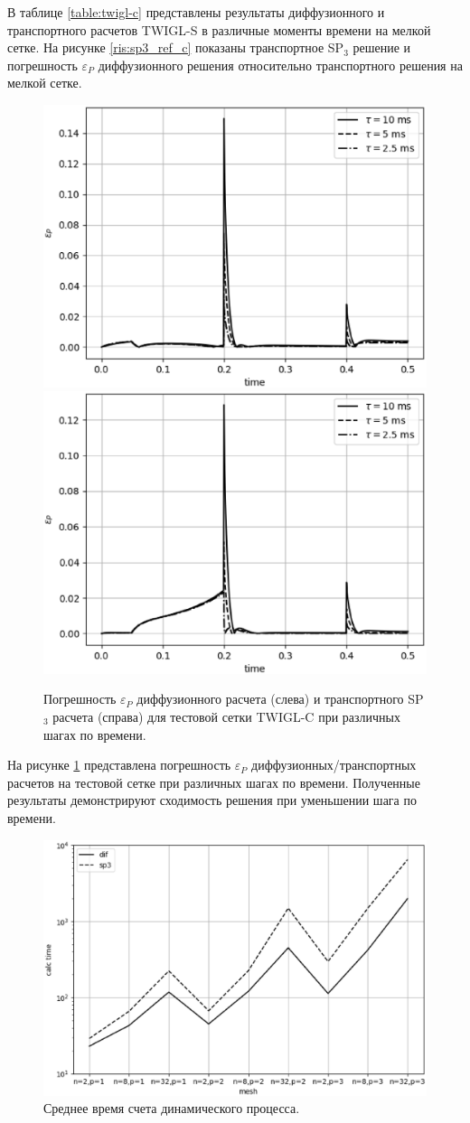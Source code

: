 \documentclass{crm-article}
\begin{document}
В таблице \ref{table:twigl-c} представлены результаты диффузионного и транспортного расчетов TWIGL-S в различные моменты времени на мелкой сетке.
На рисунке \ref{ris:sp3_ref_c} показаны транспортное SP$_3$ решение и погрешность $\varepsilon_P$ диффузионного решения относительно транспортного решения на мелкой сетке. 

\begin{figure}[ht]
\begin{center}
	\includegraphics[width=0.4\linewidth]{dif_tau_c.eps}\hspace{20pt}
	\includegraphics[width=0.4\linewidth]{sp3_tau_c.eps}\\
	\caption{\label{image:canonsummary} Погрешность $\varepsilon_P$ диффузионного расчета (слева) и  транспортного SP$_3$ расчета (справа) для тестовой сетки TWIGL-C при различных шагах по времени.}
	\label{ris:tau_c}
\end{center}
\end{figure}

На рисунке \ref{ris:tau_c} представлена погрешность $\varepsilon_P$ диффузионных/транспортных расчетов на тестовой сетке при различных шагах по времени. 
Полученные результаты демонстрируют сходимость решения при уменьшении шага по времени. 

\begin{figure}[h]
\begin{center}
	\includegraphics[width=0.7\linewidth]{calc_time.eps}
	\caption{\label{image:canonsummary} Среднее время счета динамического процесса.}
	\label{ris:calc_time}
\end{center}
\end{figure}
\end{document}
